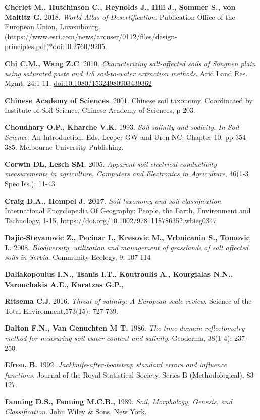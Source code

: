 \documentclass[
  10pt,
  b5paper,
]{book}
\begin{document}
\textbf{Cherlet M., Hutchinson C., Reynolds J., Hill J., Sommer S., von Maltitz G.} 2018. \emph{World Atlas of Desertification}. Publication Office of the European Union, Luxembourg. (\url{https://www.esri.com/news/arcuser/0112/files/design-principles.pdf})*\url{doi:10.2760/9205}.

\textbf{Chi C.M., Wang Z.C}. 2010. \emph{Characterizing salt-affected soils of Songnen plain using saturated paste and 1:5 soil-to-water extraction methods}. Arid Land Res. Mgmt. 24:1-11. \url{doi:10.1080/15324980903439362}

\textbf{Chinese Academy of Sciences}. 2001. Chinese soil taxonomy. Coordinated by Institute of Soil Science, Chinese Academy of Sciences, p 203.

\textbf{Choudhary O.P., Kharche V.K.} 1993. \emph{Soil salinity and sodicity. In Soil Science}: An Introduction. Eds. Leeper GW and Uren NC. Chapter 10. pp 354-385. Melbourne University Publishing.

\textbf{Corwin DL, Lesch SM.} 2005. \emph{Apparent soil electrical conductivity measurements in agriculture. Computers and Electronics in Agriculture}, 46(1-3 Spec Iss.): 11-43.

\textbf{Craig D.A., Hempel J. 2017}. \emph{Soil taxonomy and soil classification}. International Encyclopedia Of Geography: People, the Earth, Environment and Technology, 1-15, \url{https://doi.org/10.1002/9781118786352.wbieg0347}

\textbf{Dajic-Stevanovic Z., Pecinar I., Kresovic M., Vrbnicanin S., Tomovic L}. 2008. \emph{Biodiversity, utilization and management of grasslands of salt affected soils in Serbia}. Community Ecology, 9: 107-114

\textbf{Daliakopoulus I.N., Tsanis I.T., Koutroulis A., Kourgialas N.N., Varouchakis A.E., Karatzas G.P.,}

\textbf{Ritsema C.J}. 2016. \emph{Threat of salinity: A European scale review}. Science of the Total Environment,573(15): 727-739.

\textbf{Dalton F.N., Van Genuchten M T.} 1986. \emph{The time-domain reflectometry method for measuring soil water content and salinity}. Geoderma, 38(1-4): 237-250.

\textbf{Efron, B.} 1992. \emph{Jackknife-after-bootstrap standard errors and influence functions}. Journal of the Royal Statistical Society. Series B (Methodological), 83-127.

\textbf{Fanning D.S., Fanning M.C.B.,} 1989. \emph{Soil, Morphology, Genesis, and Classification}. John Wiley \& Sons, New York.
\end{document}
